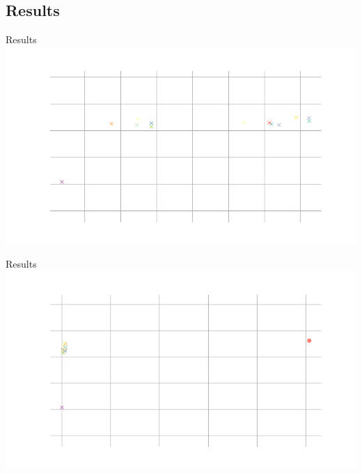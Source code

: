 \documentclass{beamer}
\begin{document}
\begin{darkframes}
    \subsection{Results}
    \begin{frame}{Results}
    	\includegraphics[width=\textwidth]{fig/params_perf}
    \end{frame}

    \begin{frame}{Results}
\includegraphics[width=\textwidth]{fig/params_perf_close}
\end{frame}


\end{darkframes}
\end{document}
